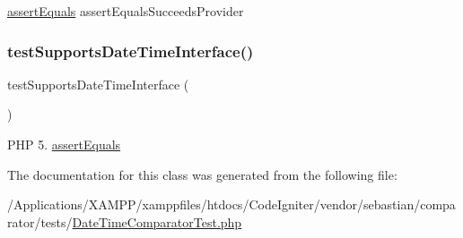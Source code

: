 \mbox{\hyperlink{_functions_8php_a441ec5f09711b6271edda774132eec5f}{assert\+Equals}}  assert\+Equals\+Succeeds\+Provider \mbox{\label{class_sebastian_bergmann_1_1_comparator_1_1_date_time_comparator_test_a72bd95f20806d2210b755b82e136ab2e}} 
\subsubsection{\texorpdfstring{test\+Supports\+Date\+Time\+Interface()}{testSupportsDateTimeInterface()}}
{\footnotesize\ttfamily test\+Supports\+Date\+Time\+Interface (\begin{DoxyParamCaption}{ }\end{DoxyParamCaption})}

P\+HP 5.  \mbox{\hyperlink{_functions_8php_a441ec5f09711b6271edda774132eec5f}{assert\+Equals}} 

The documentation for this class was generated from the following file\+:\begin{DoxyCompactItemize}
\item 
/\+Applications/\+X\+A\+M\+P\+P/xamppfiles/htdocs/\+Code\+Igniter/vendor/sebastian/comparator/tests/\mbox{\hyperlink{_date_time_comparator_test_8php}{Date\+Time\+Comparator\+Test.\+php}}\end{DoxyCompactItemize}
